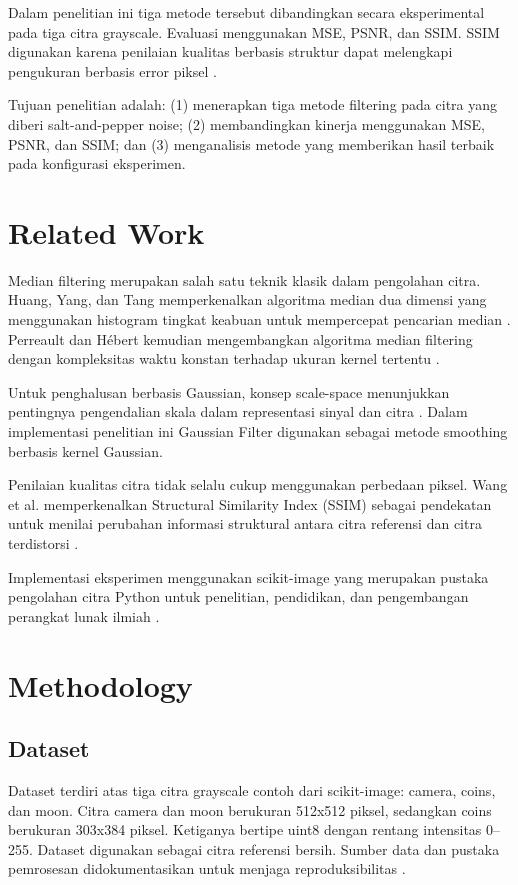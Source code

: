 \documentclass[conference,a4paper]{IEEEtran}
\begin{document}
Dalam penelitian ini tiga metode tersebut dibandingkan secara eksperimental pada tiga citra grayscale. Evaluasi menggunakan MSE, PSNR, dan SSIM. SSIM digunakan karena penilaian kualitas berbasis struktur dapat melengkapi pengukuran berbasis error piksel \cite{wang2004}.

Tujuan penelitian adalah: (1) menerapkan tiga metode filtering pada citra yang diberi salt-and-pepper noise; (2) membandingkan kinerja menggunakan MSE, PSNR, dan SSIM; dan (3) menganalisis metode yang memberikan hasil terbaik pada konfigurasi eksperimen.

\section{Related Work}
Median filtering merupakan salah satu teknik klasik dalam pengolahan citra. Huang, Yang, dan Tang memperkenalkan algoritma median dua dimensi yang menggunakan histogram tingkat keabuan untuk mempercepat pencarian median \cite{huang1979}. Perreault dan Hébert kemudian mengembangkan algoritma median filtering dengan kompleksitas waktu konstan terhadap ukuran kernel tertentu \cite{perreault2007}.

Untuk penghalusan berbasis Gaussian, konsep scale-space menunjukkan pentingnya pengendalian skala dalam representasi sinyal dan citra \cite{witkin1983}. Dalam implementasi penelitian ini Gaussian Filter digunakan sebagai metode smoothing berbasis kernel Gaussian.

Penilaian kualitas citra tidak selalu cukup menggunakan perbedaan piksel. Wang et al. memperkenalkan Structural Similarity Index (SSIM) sebagai pendekatan untuk menilai perubahan informasi struktural antara citra referensi dan citra terdistorsi \cite{wang2004}.

Implementasi eksperimen menggunakan scikit-image yang merupakan pustaka pengolahan citra Python untuk penelitian, pendidikan, dan pengembangan perangkat lunak ilmiah \cite{vanderwalt2014}.

\section{Methodology}
\subsection{Dataset}
Dataset terdiri atas tiga citra grayscale contoh dari scikit-image: camera, coins, dan moon. Citra camera dan moon berukuran 512x512 piksel, sedangkan coins berukuran 303x384 piksel. Ketiganya bertipe uint8 dengan rentang intensitas 0--255. Dataset digunakan sebagai citra referensi bersih. Sumber data dan pustaka pemrosesan didokumentasikan untuk menjaga reproduksibilitas \cite{vanderwalt2014}.
\end{document}
